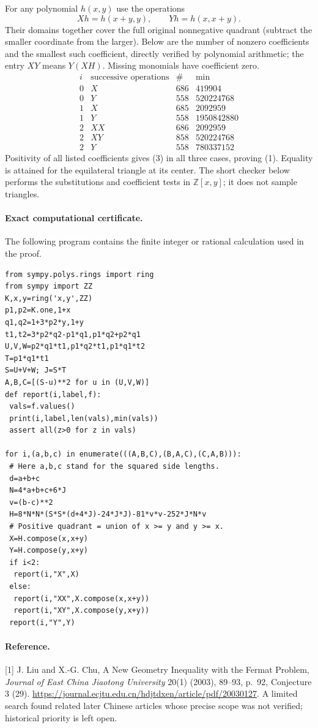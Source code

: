 \documentclass[11pt,a4paper]{article}
\numberwithin{equation}{section}
\theoremstyle{definition}
\theoremstyle{remark}
\begin{document}
For any polynomial $h(x,y)$ use the operations
\[
 Xh=h(x+y,y),\qquad Yh=h(x,x+y).
\]
Their domains together cover the full original nonnegative quadrant (subtract the smaller coordinate from the larger). Below are the number of nonzero coefficients and the smallest such coefficient, directly verified by polynomial arithmetic; the entry $XY$ means $Y(XH)$. Missing monomials have coefficient zero.
\[
\begin{array}{c|c|r|r}
 i&\text{successive operations}&\#&\min\\\hline
 0&X&686&419904\\ 0&Y&558&520224768\\
 1&X&685&2092959\\ 1&Y&558&1950842880\\
 2&XX&686&2092959\\ 2&XY&858&520224768\\
 2&Y&558&780337152
\end{array}
\]
Positivity of all listed coefficients gives (3) in all three cases, proving (1). Equality is attained for the equilateral triangle at its center. The short checker below performs the substitutions and coefficient tests in $\mathbb Z[x,y]$; it does not sample triangles.
\paragraph{Exact computational certificate.}
The following program contains the finite integer or rational calculation used in the proof.
{\small
\begin{Verbatim}
from sympy.polys.rings import ring
from sympy import ZZ
K,x,y=ring('x,y',ZZ)
p1,p2=K.one,1+x
q1,q2=1+3*p2*y,1+y
t1,t2=3*p2*q2-p1*q1,p1*q2+p2*q1
U,V,W=p2*q1*t1,p1*q2*t1,p1*q1*t2
T=p1*q1*t1
S=U+V+W; J=S*T
A,B,C=[(S-u)**2 for u in (U,V,W)]
def report(i,label,f):
 vals=f.values()
 print(i,label,len(vals),min(vals))
 assert all(z>0 for z in vals)

for i,(a,b,c) in enumerate(((A,B,C),(B,A,C),(C,A,B))):
 # Here a,b,c stand for the squared side lengths.
 d=a+b+c
 N=4*a+b+c+6*J
 v=(b-c)**2
 H=8*N*N*(S*S*(d+4*J)-24*J*J)-81*v*v-252*J*N*v
 # Positive quadrant = union of x >= y and y >= x.
 X=H.compose(x,x+y)
 Y=H.compose(y,x+y)
 if i<2:
  report(i,"X",X)
 else:
  report(i,"XX",X.compose(x,x+y))
  report(i,"XY",X.compose(y,x+y))
 report(i,"Y",Y)
\end{Verbatim}

}

\paragraph{Reference.} [1] J. Liu and X.-G. Chu, A New Geometry Inequality with the Fermat Problem, \emph{Journal of East China Jiaotong University} 20(1) (2003), 89--93, p.~92, Conjecture 3 (29). \url{https://journal.ecjtu.edu.cn/hdjtdxen/article/pdf/20030127}. A limited search found related later Chinese articles whose precise scope was not verified; historical priority is left open.
\end{document}
